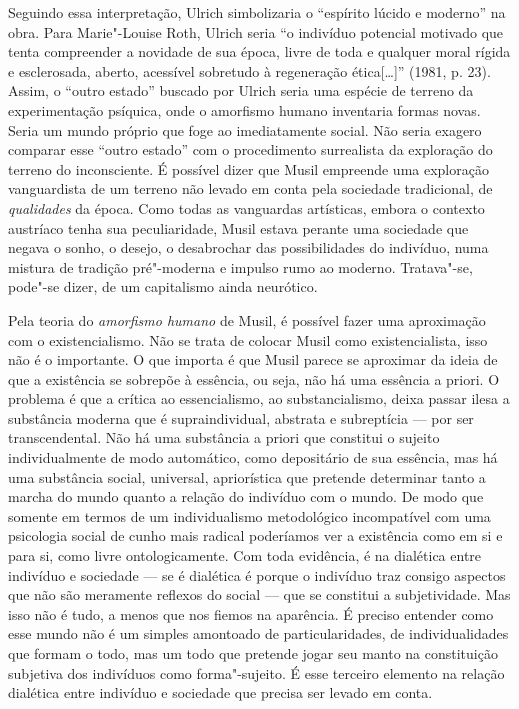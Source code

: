 Seguindo essa interpretação, Ulrich simbolizaria o ``espírito lúcido e
moderno'' na obra. Para Marie"-Louise Roth, Ulrich seria ``o indivíduo
potencial motivado que tenta compreender a novidade de sua época, livre
de toda e qualquer moral rígida e esclerosada, aberto, acessível
sobretudo à regeneração ética[\ldots{}]'' (1981, p. 23). Assim, o ``outro
estado'' buscado por Ulrich seria uma espécie de terreno da
experimentação psíquica, onde o amorfismo humano inventaria formas
novas. Seria um mundo próprio que foge ao imediatamente social. Não
seria exagero comparar esse ``outro estado'' com o procedimento
surrealista da exploração do terreno do inconsciente. É possível dizer
que Musil empreende uma exploração vanguardista de um terreno não levado em
conta pela sociedade tradicional, de \emph{qualidades} da época. Como
todas as vanguardas artísticas, embora o contexto austríaco tenha sua
peculiaridade, Musil estava perante uma sociedade que negava o sonho, o
desejo, o desabrochar das possibilidades do indivíduo, numa mistura de
tradição pré"-moderna e impulso rumo ao moderno. Tratava"-se, pode"-se
dizer, de um capitalismo ainda neurótico.

Pela teoria do \emph{amorfismo humano} de Musil, é possível fazer uma
aproximação com o existencialismo. Não se trata de colocar Musil como
existencialista, isso não é o importante. O que importa é que Musil
parece se aproximar da ideia de que a existência se sobrepõe à essência,
ou seja, não há uma essência a priori. O problema é que a crítica ao
essencialismo, ao substancialismo, deixa passar ilesa a substância
moderna que é supraindividual, abstrata e subreptícia --- por ser
transcendental. Não há uma substância a priori que constitui o sujeito
individualmente de modo automático, como depositário de sua essência, mas há uma
substância social, universal, apriorística que pretende determinar tanto
a marcha do mundo quanto a relação do indivíduo com o mundo. De modo que
somente em termos de um individualismo metodológico incompatível com uma
psicologia social de cunho mais radical poderíamos ver a existência como
em si e para si, como livre ontologicamente. Com toda evidência, é na
dialética entre indivíduo e sociedade --- se é dialética é porque o
indivíduo traz consigo aspectos que não são meramente reflexos do social
--- que se constitui a subjetividade. Mas isso não é tudo, a menos que
nos fiemos na aparência. É preciso entender como esse mundo não é um
simples amontoado de particularidades, de individualidades que formam o
todo, mas um todo que pretende jogar seu manto na constituição subjetiva
dos indivíduos como forma"-sujeito. É esse terceiro elemento na relação
dialética entre indivíduo e sociedade que precisa ser levado em conta.

